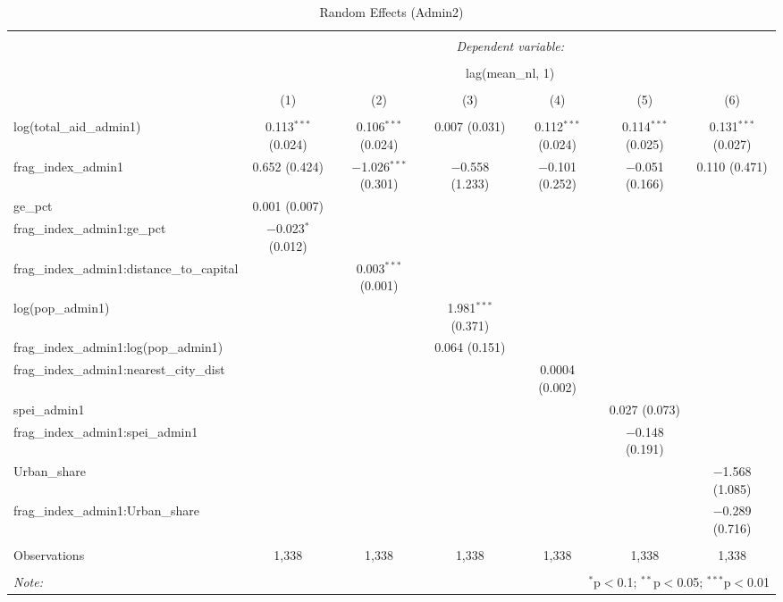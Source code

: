 
\begin{table}[!htbp] \centering 
  \caption{Random Effects (Admin2)} 
  \label{} 
\begin{tabular}{@{\extracolsep{5pt}}lcccccc} 
\\[-1.8ex]\hline 
\hline \\[-1.8ex] 
 & \multicolumn{6}{c}{\textit{Dependent variable:}} \\ 
\cline{2-7} 
\\[-1.8ex] & \multicolumn{6}{c}{lag(mean\_nl, 1)} \\ 
\\[-1.8ex] & (1) & (2) & (3) & (4) & (5) & (6)\\ 
\hline \\[-1.8ex] 
 log(total\_aid\_admin1) & 0.113$^{***}$ (0.024) & 0.106$^{***}$ (0.024) & 0.007 (0.031) & 0.112$^{***}$ (0.024) & 0.114$^{***}$ (0.025) & 0.131$^{***}$ (0.027) \\ 
  frag\_index\_admin1 & 0.652 (0.424) & $-$1.026$^{***}$ (0.301) & $-$0.558 (1.233) & $-$0.101 (0.252) & $-$0.051 (0.166) & 0.110 (0.471) \\ 
  ge\_pct & 0.001 (0.007) &  &  &  &  &  \\ 
  frag\_index\_admin1:ge\_pct & $-$0.023$^{*}$ (0.012) &  &  &  &  &  \\ 
  frag\_index\_admin1:distance\_to\_capital &  & 0.003$^{***}$ (0.001) &  &  &  &  \\ 
  log(pop\_admin1) &  &  & 1.981$^{***}$ (0.371) &  &  &  \\ 
  frag\_index\_admin1:log(pop\_admin1) &  &  & 0.064 (0.151) &  &  &  \\ 
  frag\_index\_admin1:nearest\_city\_dist &  &  &  & 0.0004 (0.002) &  &  \\ 
  spei\_admin1 &  &  &  &  & 0.027 (0.073) &  \\ 
  frag\_index\_admin1:spei\_admin1 &  &  &  &  & $-$0.148 (0.191) &  \\ 
  Urban\_share &  &  &  &  &  & $-$1.568 (1.085) \\ 
  frag\_index\_admin1:Urban\_share &  &  &  &  &  & $-$0.289 (0.716) \\ 
 \hline \\[-1.8ex] 
Observations & 1,338 & 1,338 & 1,338 & 1,338 & 1,338 & 1,338 \\ 
\hline 
\hline \\[-1.8ex] 
\textit{Note:}  & \multicolumn{6}{r}{$^{*}$p$<$0.1; $^{**}$p$<$0.05; $^{***}$p$<$0.01} \\ 
\end{tabular} 
\end{table} 

